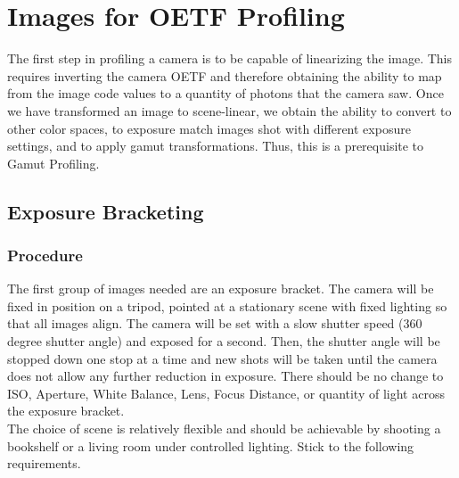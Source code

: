 \documentclass[twoside]{article}
\begin{document}
\newpage\section{Images for OETF Profiling}
The first step in profiling a camera is to be capable of linearizing the image. This requires inverting the camera OETF and therefore obtaining the ability to map from the image code values to a quantity of photons that the camera saw. Once we have transformed an image to scene-linear, we obtain the ability to convert to other color spaces, to exposure match images shot with different exposure settings, and to apply gamut transformations. Thus, this is a prerequisite to Gamut Profiling. \\

\subsection{Exposure Bracketing}

\subsubsection{Procedure}
The first group of images needed are an exposure bracket. The camera will be fixed in position on a tripod, pointed at a stationary scene with fixed lighting so that all images align. The camera will be set with a slow shutter speed (360 degree shutter angle) and exposed for a second. Then, the shutter angle will be stopped down one stop at a time and new shots will be taken until the camera does not allow any further reduction in exposure. There should be no change to ISO, Aperture, White Balance, Lens, Focus Distance, or quantity of light across the exposure bracket. \\

The choice of scene is relatively flexible and should be achievable by shooting a bookshelf or a living room under controlled lighting. Stick to the following requirements.
\end{document}
